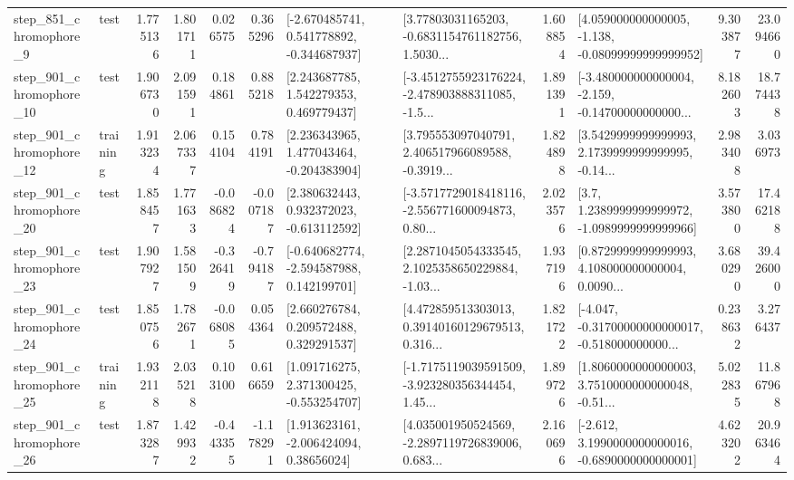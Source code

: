 \begin{tabular}{llrrrrllrlrr}
   step\_851\_chromophore\_9 &      test &      1.775136 &    1.801711 &      0.026575 &  0.365296 &   [-2.670485741, 0.541778892, -0.344687937] &  [3.77803031165203, -0.6831154761182756, 1.5030... &       1.608854 &  [4.059000000000005, -1.138, -0.08099999999999952] &            9.303877 &         23.094660 \\
  step\_901\_chromophore\_10 &      test &      1.906730 &    2.091591 &      0.184861 &  0.885218 &     [2.243687785, 1.542279353, 0.469779437] &  [-3.4512755923176224, -2.478903888311085, -1.5... &       1.891391 &  [-3.480000000000004, -2.159, -0.14700000000000... &            8.182603 &         18.774438 \\
  step\_901\_chromophore\_12 &  training &      1.913234 &    2.067337 &      0.154104 &  0.784191 &    [2.236343965, 1.477043464, -0.204383904] &  [3.795553097040791, 2.406517966089588, -0.3919... &       1.824898 &  [3.5429999999999993, 2.1739999999999995, -0.14... &            2.983408 &          3.036973 \\
  step\_901\_chromophore\_20 &      test &      1.858457 &    1.771633 &     -0.086824 & -0.007187 &    [2.380632443, 0.932372023, -0.613112592] &  [-3.5717729018418116, -2.556771600094873, 0.80... &       2.023576 &     [3.7, 1.2389999999999972, -1.0989999999999966] &            3.573800 &         17.462188 \\
  step\_901\_chromophore\_23 &      test &      1.907927 &    1.581509 &     -0.326419 & -0.794187 &   [-0.640682774, -2.594587988, 0.142199701] &  [2.2871045054333545, 2.1025358650229884, -1.03... &       1.937196 &  [0.8729999999999993, 4.108000000000004, 0.0090... &            3.680290 &         39.426000 \\
  step\_901\_chromophore\_24 &      test &      1.850756 &    1.782671 &     -0.068085 &  0.054364 &     [2.660276784, 0.209572488, 0.329291537] &  [4.472859513303013, 0.39140160129679513, 0.316... &       1.821722 &  [-4.047, -0.31700000000000017, -0.518000000000... &            0.238632 &          3.276437 \\
  step\_901\_chromophore\_25 &  training &      1.932118 &    2.035218 &      0.103100 &  0.616659 &    [1.091716275, 2.371300425, -0.553254707] &  [-1.7175119039591509, -3.923280356344454, 1.45... &       1.899726 &  [1.8060000000000003, 3.7510000000000048, -0.51... &            5.022835 &         11.867968 \\
  step\_901\_chromophore\_26 &      test &      1.873287 &    1.429932 &     -0.443355 & -1.178291 &     [1.913623161, -2.006424094, 0.38656024] &  [4.035001950524569, -2.2897119726839006, 0.683... &       2.160696 &  [-2.612, 3.1990000000000016, -0.6890000000000001] &            4.623202 &         20.963464 \\

\end{tabular}

